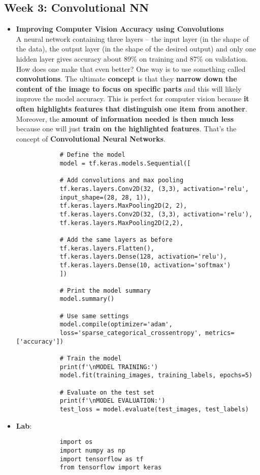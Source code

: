 \documentclass[20pt]{article}
\begin{document}
	\subsection{Week 3: Convolutional NN}
	\begin{itemize}
		\item \textbf{Improving Computer Vision Accuracy using Convolutions}\\
		A neural network containing three layers -- the input layer (in the shape of the data), the output layer (in the shape of the desired output) and only one hidden layer gives accuracy about 89\% on training and 87\% on validation. How does one make that even better? One way is to use something called \textbf{convolutions}. The ultimate \textbf{concept} is that they \textbf{narrow down the content of the image to focus on specific parts} and this will likely improve the model accuracy. This is perfect for computer vision because \textbf{it often highlights features that distinguish one item from another}. Moreover, the \textbf{amount of information needed is then much less} because one will just \textbf{train on the highlighted features}.
		That's the concept of \textbf{Convolutional Neural Networks}.
		\begin{verbatim}
			# Define the model
			model = tf.keras.models.Sequential([
			
			# Add convolutions and max pooling
			tf.keras.layers.Conv2D(32, (3,3), activation='relu',
			input_shape=(28, 28, 1)),
			tf.keras.layers.MaxPooling2D(2, 2),
			tf.keras.layers.Conv2D(32, (3,3), activation='relu'),
			tf.keras.layers.MaxPooling2D(2,2),
			
			# Add the same layers as before
			tf.keras.layers.Flatten(),
			tf.keras.layers.Dense(128, activation='relu'),
			tf.keras.layers.Dense(10, activation='softmax')
			])
			
			# Print the model summary
			model.summary()
			
			# Use same settings
			model.compile(optimizer='adam',
			loss='sparse_categorical_crossentropy', metrics=['accuracy'])
			
			# Train the model
			print(f'\nMODEL TRAINING:')
			model.fit(training_images, training_labels, epochs=5)
			
			# Evaluate on the test set
			print(f'\nMODEL EVALUATION:')
			test_loss = model.evaluate(test_images, test_labels)
		\end{verbatim} 
		\item \textbf{Lab}:
		\begin{verbatim}
			import os
			import numpy as np
			import tensorflow as tf
			from tensorflow import keras
			

\end{verbatim}
\end{itemize}
\end{document}
